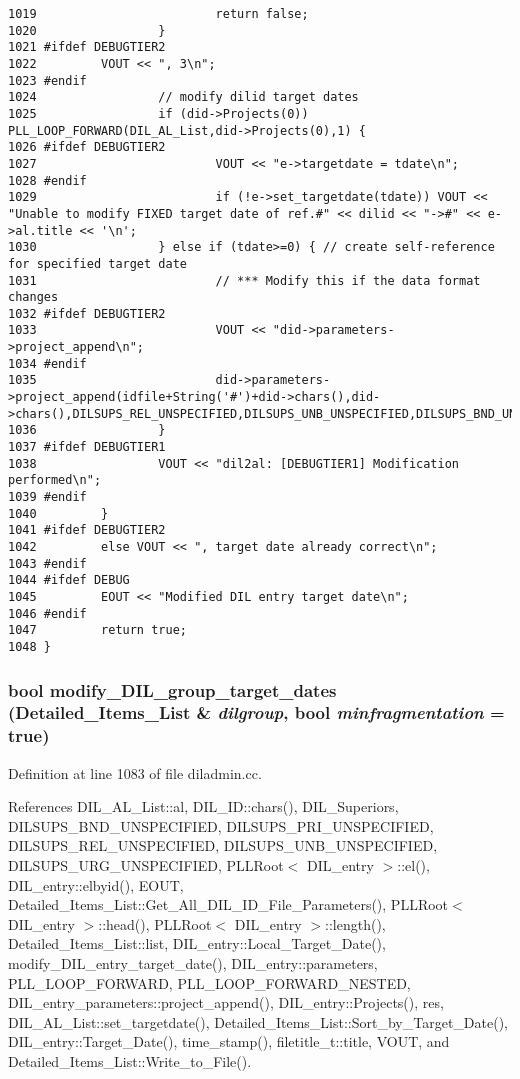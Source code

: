 \begin{verbatim}
1019                         return false;
1020                 }
1021 #ifdef DEBUGTIER2
1022         VOUT << ", 3\n";
1023 #endif
1024                 // modify dilid target dates
1025                 if (did->Projects(0)) PLL_LOOP_FORWARD(DIL_AL_List,did->Projects(0),1) {
1026 #ifdef DEBUGTIER2
1027                         VOUT << "e->targetdate = tdate\n";
1028 #endif
1029                         if (!e->set_targetdate(tdate)) VOUT << "Unable to modify FIXED target date of ref.#" << dilid << "->#" << e->al.title << '\n';
1030                 } else if (tdate>=0) { // create self-reference for specified target date
1031                         // *** Modify this if the data format changes
1032 #ifdef DEBUGTIER2
1033                         VOUT << "did->parameters->project_append\n";
1034 #endif
1035                         did->parameters->project_append(idfile+String('#')+did->chars(),did->chars(),DILSUPS_REL_UNSPECIFIED,DILSUPS_UNB_UNSPECIFIED,DILSUPS_BND_UNSPECIFIED,tdate,0,DILSUPS_URG_UNSPECIFIED,DILSUPS_PRI_UNSPECIFIED);
1036                 }
1037 #ifdef DEBUGTIER1
1038                 VOUT << "dil2al: [DEBUGTIER1] Modification performed\n";
1039 #endif
1040         }
1041 #ifdef DEBUGTIER2
1042         else VOUT << ", target date already correct\n";
1043 #endif
1044 #ifdef DEBUG
1045         EOUT << "Modified DIL entry target date\n";
1046 #endif
1047         return true;
1048 }
\end{verbatim}\normalsize 
{}
\subsubsection{\setlength{\rightskip}{0pt plus 5cm}bool modify\_\-DIL\_\-group\_\-target\_\-dates ({\bf Detailed\_\-Items\_\-List} \& {\em dilgroup}, bool {\em minfragmentation} = {\bf true})}\label{dil2al_8hh_a308}




Definition at line 1083 of file diladmin.cc.

References DIL\_\-AL\_\-List::al, DIL\_\-ID::chars(), DIL\_\-Superiors, DILSUPS\_\-BND\_\-UNSPECIFIED, DILSUPS\_\-PRI\_\-UNSPECIFIED, DILSUPS\_\-REL\_\-UNSPECIFIED, DILSUPS\_\-UNB\_\-UNSPECIFIED, DILSUPS\_\-URG\_\-UNSPECIFIED, PLLRoot$<$ DIL\_\-entry $>$::el(), DIL\_\-entry::elbyid(), EOUT, Detailed\_\-Items\_\-List::Get\_\-All\_\-DIL\_\-ID\_\-File\_\-Parameters(), PLLRoot$<$ DIL\_\-entry $>$::head(), PLLRoot$<$ DIL\_\-entry $>$::length(), Detailed\_\-Items\_\-List::list, DIL\_\-entry::Local\_\-Target\_\-Date(), modify\_\-DIL\_\-entry\_\-target\_\-date(), DIL\_\-entry::parameters, PLL\_\-LOOP\_\-FORWARD, PLL\_\-LOOP\_\-FORWARD\_\-NESTED, DIL\_\-entry\_\-parameters::project\_\-append(), DIL\_\-entry::Projects(), res, DIL\_\-AL\_\-List::set\_\-targetdate(), Detailed\_\-Items\_\-List::Sort\_\-by\_\-Target\_\-Date(), DIL\_\-entry::Target\_\-Date(), time\_\-stamp(), filetitle\_\-t::title, VOUT, and Detailed\_\-Items\_\-List::Write\_\-to\_\-File().


